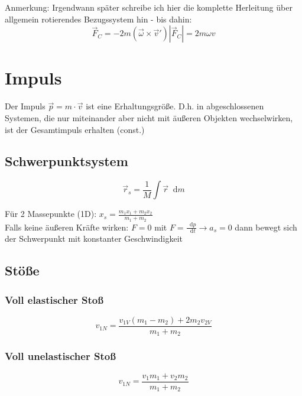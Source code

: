 \documentclass[a4paper,12pt]{report}
\newcommand*\diff{\mathop{}\!\mathrm{d}}
\begin{document}
Anmerkung: Irgendwann später schreibe ich hier die komplette Herleitung über allgemein rotierendes Bezugssystem hin - bis dahin:\\

\begin{equation}
\vec{F}_C = - 2m(\vec{\omega} \times \vec{v}')    |\vec{F}_C| = 2m \omega v 
\end{equation}

\section{Impuls}

Der Impuls $\vec{p} = m \cdot \vec{v}$  ist eine Erhaltungsgröße. D.h. in abgeschlossenen Systemen, die nur miteinander aber nicht mit äußeren Objekten wechselwirken, ist der Gesamtimpuls erhalten (const.)

\subsection{Schwerpunktsystem}

\begin{equation}
\vec{r}_s = \frac{1}{M} \int{\vec{r}\diff m}
\end{equation}

Für 2 Massepunkte (1D): $ x_s = \frac{m_1 x_1 + m_2 x_2}{m_1 + m_2} $ \\

Falls keine äußeren Kräfte wirken: $ F = 0 $ mit $ F = \frac{\diff p}{\diff t}  \rightarrow a_s = 0 $ dann bewegt sich der Schwerpunkt mit konstanter Geschwindigkeit

\subsection{Stöße}

\subsubsection{Voll elastischer Stoß}
\begin{equation*}
v_{1N} = \frac{v_{1V}(m_1-m_2)+ 2 m_2 v_{2V}}{m_1+m_2} 
\end{equation*} 

\subsubsection{Voll unelastischer Stoß}
\begin{equation*}
v_{1N} = \frac{v_1 m_1 + v_2 m_2}{m_1 + m_2} 
\end{equation*}
\end{document}
